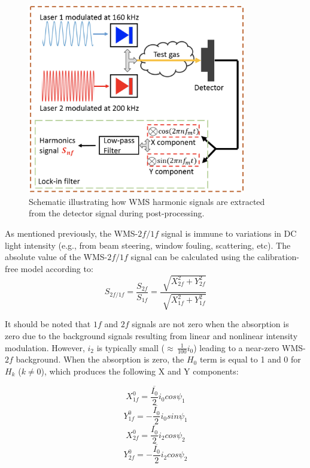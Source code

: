  \begin{figure}[h]
    \centering
        \includegraphics[width=0.85\textwidth]{fig/ch3_fig1_v3.png}
        \caption{Schematic illustrating how WMS harmonic signals are extracted from the detector signal during post-processing.}
    \label{fig:ch3_1}
\end{figure}

As mentioned previously, the WMS-$2f/1f$ signal is immune to variations in DC light intensity (e.g., from beam steering, window fouling, scattering, etc). The absolute value of the WMS-$2f/1f$ signal can be calculated using the calibration-free model according to:
\begin{equation}
S_{2f/1f}=\frac{S_{2f}}{S_{1f}}=\frac{\sqrt[]{X_{2f}^2+Y_{2f}^2}}{\sqrt[]{X_{1f}^2+Y_{1f}^2}}
\end{equation}

\noindent It should be noted that $1f$ and $2f$ signals are not zero when the absorption is zero due to the background signals resulting from linear and nonlinear intensity modulation. However, $i_2$ is typically small ($\approx \, \frac{1}{100}i_0$) leading to a near-zero WMS-$2f$ background. When the absorption is zero, the $H_0$ term is equal to 1 and 0 for $H_k$ ($k\neq 0$), which produces the following X and Y components:

\begin{equation}
X_{1f}^0=\frac{\overline{I_0}}{2}i_0cos\psi_1
\end{equation}
\begin{equation}
Y_{1f}^0=-\frac{\overline{I_0}}{2}i_0sin\psi_1
\end{equation}
\begin{equation}
X_{2f}^0=\frac{\overline{I_0}}{2}i_2cos\psi_2
\end{equation}
\begin{equation}
Y_{2f}^0=-\frac{\overline{I_0}}{2}i_2cos\psi_2
\end{equation}

